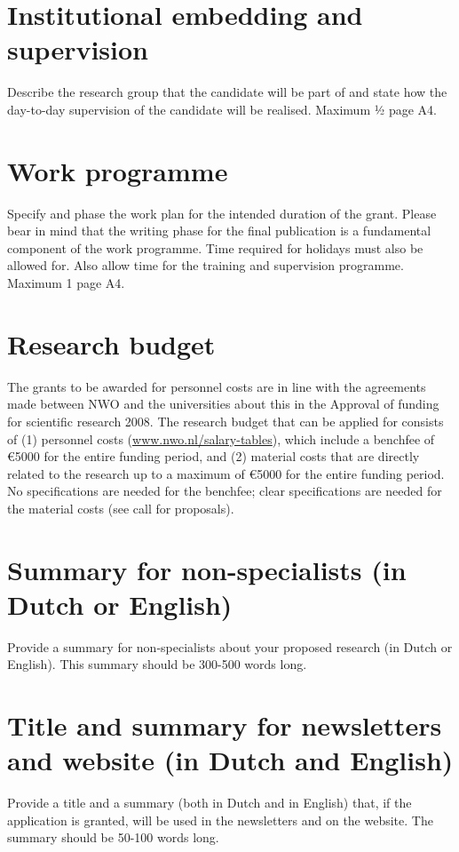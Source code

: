 \documentclass{article}
\begin{document}
\section{Institutional embedding and supervision}
Describe the research group that the candidate will be part of and state how the day-to-day supervision of the candidate will be realised. Maximum ½ page A4.

\section{Work programme}
Specify and phase the work plan for the intended duration of the grant. Please bear in mind that the writing phase for the final publication is a fundamental component of the work programme. Time required for holidays must also be allowed for. Also allow time for the training and supervision programme. Maximum 1 page A4.

\section{Research budget}

The grants to be awarded for personnel costs are in line with the agreements made between NWO and the universities about this in the Approval of funding for scientific research 2008. The research budget that can be applied for consists of (1) personnel costs (\url{www.nwo.nl/salary-tables}), which include a benchfee of \euro 5000 for the entire funding period, and (2) material costs that are directly related to the research up to a maximum of \euro 5000 for the entire funding period. No specifications are needed for the benchfee; clear specifications are needed for the material costs (see call for proposals).

\section{Summary for non-specialists (in Dutch or English)}
Provide a summary for non-specialists about your proposed research (in Dutch or English). This summary should be 300-500 words long.


\section{Title and summary for newsletters and website (in Dutch and English)}

Provide a title and a summary (both in Dutch and in English) that, if the application is granted, will be used in the newsletters and on the website. The summary should be 50-100 words long.
\end{document}
